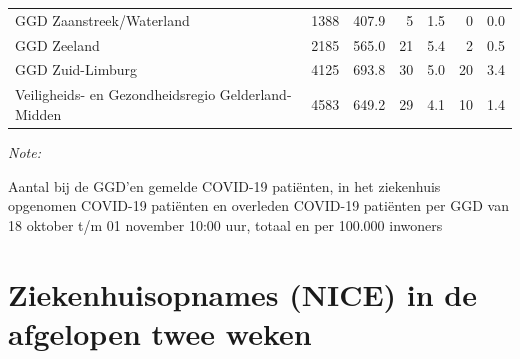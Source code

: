 \documentclass[
  english,
  man,floatsintext]{apa6}
\begin{document}
\begin{table}
\begin{threeparttable}
\begin{tabular}{lrrrrrr}
GGD Zaanstreek/Waterland & 1388 & 407.9 & 5 & 1.5 & 0 & 0.0\\
GGD Zeeland & 2185 & 565.0 & 21 & 5.4 & 2 & 0.5\\
GGD Zuid-Limburg & 4125 & 693.8 & 30 & 5.0 & 20 & 3.4\\
Veiligheids- en Gezondheidsregio Gelderland-Midden & 4583 & 649.2 & 29 & 4.1 & 10 & 1.4\\
\bottomrule
\end{tabular}
\begin{tablenotes}
\item \textit{Note: } 
\item Aantal bij de GGD’en gemelde COVID-19 patiënten, in het ziekenhuis opgenomen COVID-19 patiënten en overleden COVID-19 patiënten per GGD van 18 oktober t/m 01 november 10:00 uur, totaal en per 100.000 inwoners
\end{tablenotes}
\end{threeparttable}
\endgroup{}
\end{table}

\newpage

\hypertarget{ziekenhuisopnames-nice-in-de-afgelopen-twee-weken}{%
\section{Ziekenhuisopnames (NICE) in de afgelopen twee weken}\label{ziekenhuisopnames-nice-in-de-afgelopen-twee-weken}}
\end{document}
